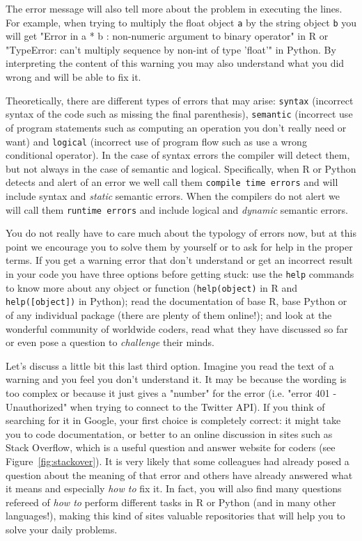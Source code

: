 The error message will also tell more about the problem in executing the lines. For example, when trying to multiply the float object \texttt{a} by the string object \texttt{b} you will get "Error in a * b : non-numeric argument to binary operator" in R or "TypeError: can't multiply sequence by non-int of type 'float'" in Python. By interpreting the content of this warning you may also understand what you did wrong and will be able to fix it. 

Theoretically, there are different types of errors that may arise: \texttt{syntax} (incorrect syntax of the code such as missing the final parenthesis), \texttt{semantic} (incorrect use of program statements such as computing an operation you don't really need or want) and \texttt{logical} (incorrect use of program flow such as use a wrong conditional operator). In the case of syntax errors the compiler will detect them, but not always in the case of semantic and logical. Specifically, when R or Python detects and alert of an error we well call them \texttt{compile time errors} and will include syntax and \textit{static} semantic errors. When the compilers do not alert we will call them \texttt{runtime errors} and include logical and \textit{dynamic} semantic errors.

You do not really have to care much about the typology of errors now, but at this point we encourage you to solve them by yourself or to ask for help in the proper terms. If you get a warning error that don't understand or get an incorrect result in your code you have three options before getting stuck: use the \texttt{help} commands to know more about any object or function (\verb|help(object)| in R and \verb|help([object])| in Python); read the documentation of base R, base Python or of any individual package (there are plenty of them online!); and look at the wonderful community of worldwide coders, read what they have discussed so far or even pose a question to \textit{challenge} their minds.

Let's discuss a little bit this last third option. Imagine you read the text of a warning and you feel you don't understand it. It may be because the wording is too complex or because it just gives a "number" for the error (i.e. "error 401 - Unauthorized" when trying to connect to the Twitter API). If you think of searching for it in Google, your first choice is completely correct: it might take you to code documentation, or better to an online discussion in sites such as Stack Overflow, which is a useful question and answer website for coders (see Figure~\ref{fig:stackover}). It is very likely that some colleagues had already posed a question about the meaning of that error and others have already answered what it means and especially \textit{how to} fix it. In fact, you will also find many questions refereed of \textit{how to} perform different tasks in R or Python (and in many other languages!),  making this kind of sites valuable repositories that will help you to solve your daily problems.

